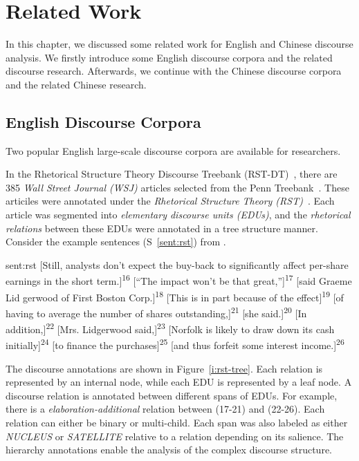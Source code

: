%
%
%
\chapter{Related Work}
\label{c:related}

In this chapter, we discussed some related work for English and Chinese discourse
analysis. We firstly introduce some English discourse corpora and the
related discourse research. Afterwards, we continue with the Chinese
discourse corpora and the related Chinese research.

\section{English Discourse Corpora}

Two popular English large-scale discourse corpora are available for researchers.

In the Rhetorical Structure Theory Discourse Treebank (RST-DT)~\citep{Carlson01building},
there are 385 \textit{Wall Street Journal (WSJ)} articles selected from
the Penn Treebank~\citep{marcus1993building}. These articiles were annotated under
the \textit{Rhetorical Structure Theory (RST)}~\citep{mann-thompson88}.
Each article was segmented into \textit{elementary discourse units (EDUs)}, and the
\textit{rhetorical relations} between these EDUs were annotated in a tree structure
manner.
Consider the example sentences (S~\ref{sent:rst}) from \cite{Carlson01building}.

\begin{sent}{sent:rst}{}
[Still, analysts don't expect the buy-back to significantly affect per-share earnings in the short
term.]\textsuperscript{16} [``The impact won't be that great,'']\textsuperscript{17}
[said Graeme Lid gerwood of First Boston Corp.]\textsuperscript{18}
[This is in part because of the effect]\textsuperscript{19}
[of having to average the number of shares outstanding,]\textsuperscript{21}
[she said.]\textsuperscript{20} [In addition,]\textsuperscript{22}
[Mrs. Lidgerwood said,]\textsuperscript{23}
[Norfolk is likely to draw down its cash initially]\textsuperscript{24}
[to finance the purchases]\textsuperscript{25}
[and thus forfeit some interest income.]\textsuperscript{26}
\end{sent}

The discourse annotations are shown in Figure~\ref{i:rst-tree}. Each relation is represented
by an internal node, while each EDU is represented by a leaf node. A discourse relation is
annotated between different spans of EDUs. For example, there is a \textit{elaboration-additional}
relation between (17-21) and (22-26). Each relation can either be binary or multi-child.
Each span was also labeled as either \textit{NUCLEUS} or \textit{SATELLITE} relative
to a relation depending on its salience. The hierarchy annotations enable the analysis of
the complex discourse structure.

